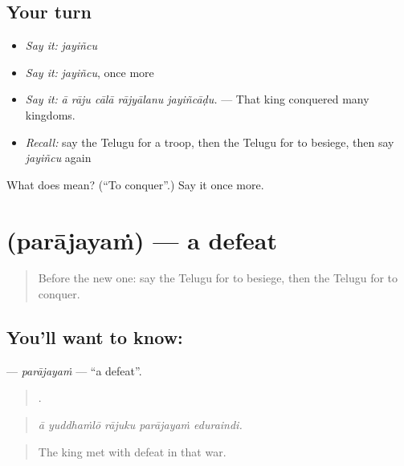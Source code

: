 \subsection*{Your turn}
\begin{itemize}
\raggedright
  \item \emph{Say it:} \emph{jayiñcu}
  \item \emph{Say it:} \emph{jayiñcu}, once more
  \item \emph{Say it:} \emph{ā rāju cālā rājyālanu jayiñcāḍu.} — That king conquered many kingdoms.
  \item \emph{Recall:} say the Telugu for a troop, then the Telugu for to besiege, then say \emph{jayiñcu} again
\end{itemize}

\begin{tcolorbox}[breakable,colback=teal!4,colframe=teal!35!black,title={Before you move on}]
What does  mean? (\textquotedblleft{}To conquer\textquotedblright{}.) Say it once more.
\end{tcolorbox}
\section[\texorpdfstring{\te{పరాజయం} (parājayaṁ)}{పరాజయం (parājayaṁ)}]{ (parājayaṁ) — a defeat}

\label{lesson:TE-C361-parajayam}



\begin{quote}
Before the new one: say the Telugu for to besiege, then the Telugu for to conquer.
\end{quote}

\subsection*{You'll want to know: }
\textbf{} — \emph{parājayaṁ} — \textquotedblleft{}a defeat\textquotedblright{}.

\begin{quote}
    .
\end{quote}

\begin{quote}
\emph{ā yuddhaṁlō rājuku parājayaṁ eduraindi.}
\end{quote}

\begin{quote}
The king met with defeat in that war.
\end{quote}

